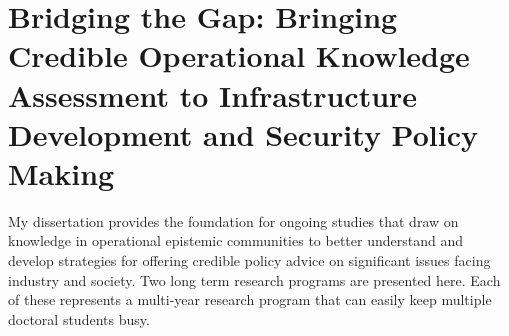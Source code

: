 \documentclass[12pt,journal,compsoc,letterpaper,onecolumn,twoside]{IEEEtran}
\begin{document}
\section{Bridging the Gap: Bringing Credible Operational
  Knowledge Assessment to Infrastructure Development and Security
  Policy Making}  \label{sec:ongoing}  


My dissertation provides the foundation for ongoing studies
that draw on knowledge in operational epistemic
communities to better understand and develop strategies for
offering credible policy advice on significant issues facing industry
and society. 
%
Two long term research programs are presented here.
%
Each of these represents a multi-year research program that can easily
keep multiple doctoral students busy.
\end{document}
